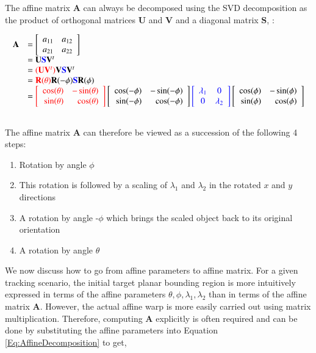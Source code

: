 The affine matrix $\mathbf{A}$ can always be decomposed using the SVD decomposition as the product of orthogonal matrices $\mathbf{U}$ and $\mathbf{V}$ and a diagonal matrix $\mathbf{S}$, \cite{2004_BOOK_CG_Hartley}:

\begin{equation}
\begin{array}{llllllll}
\mathbf{A} &= \left[\begin{array}{lll}a_{11} & a_{12} \\ a_{21} & a_{22}\\ \end{array}\right] \\
&=\mathbf{U}{\color{blue}\mathbf{S}}\mathbf{V}^t \\
&={\color{red}(\mathbf{U}\mathbf{V}^t)}\mathbf{V}{\color{blue}\mathbf{S}}\mathbf{V}^t\\
&={\color{red}\mathbf{R}(\theta)}\mathbf{R}(-\phi){\color{blue}\mathbf{S}}\mathbf{R} (\phi)\\
&={\color{red}\left[ \begin{array}{rr} \cos(\theta) & -\sin(\theta) \\ \sin(\theta) & \cos(\theta) \\ \end{array} \right]}\left[ \begin{array}{rr} \cos(-\phi) & -\sin(-\phi) \\ \sin(-\phi) & \cos(-\phi) \\ \end{array} \right]{\color{blue} \left[ \begin{array}{cc} \lambda_1 & 0\\ 0 & \lambda_2 \end{array} \right] }\left[ \begin{array}{rr} \cos(\phi) & -\sin(\phi) \\ \sin(\phi) & \cos(\phi) \\ \end{array} \right]\\\\
\end{array}
\label{Eq:AffineDecomposition}
\end{equation}

The affine matrix $\mathbf{A}$ can therefore be viewed as a succession of the following 4 steps:

\begin{enumerate} 
\item Rotation by angle $\phi$ 
\item This rotation is followed by a scaling of $\lambda_1$ and $\lambda_2$ in the rotated $x$ and $y$ directions
\item A rotation by angle -$\phi$ which brings the scaled object back to its original orientation
\item A rotation by angle $\theta$
\end{enumerate}

We now discuss how to go from affine parameters to affine matrix.  For a given tracking scenario, the initial target planar bounding region is more intuitively expressed in terms of the affine parameters $\theta, \phi, \lambda_1, \lambda_2$ than in terms of the affine matrix $\mathbf{A}$.  However, the actual affine warp is more easily carried out using matrix multiplication.  Therefore, computing $\mathbf{A}$ explicitly is often required and can be done by substituting the affine parameters into Equation \ref{Eq:AffineDecomposition} to get,

